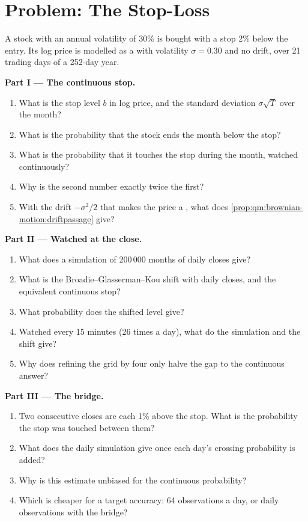 \section{Problem: The Stop-Loss}

\begin{problem}\label{pb:qm:brownian-motion:1}
A stock with an annual volatility of 30\% is bought with a stop 2\% below the entry. Its log
price is modelled as a  with volatility $\sigma = 0.30$ and no drift, over 21
trading days of a 252-day year.

\medskip\noindent\textbf{Part I --- The continuous stop.}
\begin{enumerate}
\item What is the stop level $b$ in log price, and the standard deviation $\sigma\sqrt T$ over the month?
\item What is the probability that the stock ends the month below the stop?
\item What is the probability that it touches the stop during the month, watched continuously?
\item Why is the second number exactly twice the first?
\item With the drift $-\sigma^2/2$ that makes the price a , what does \cref{prop:qm:brownian-motion:driftpassage} give?
\end{enumerate}

\medskip\noindent\textbf{Part II --- Watched at the close.}
\begin{enumerate}[resume]
\item What does a simulation of 200\,000 months of daily closes give?
\item What is the Broadie--Glasserman--Kou shift with daily closes, and the equivalent continuous stop?
\item What probability does the shifted level give?
\item Watched every 15 minutes (26 times a day), what do the simulation and the shift give?
\item Why does refining the grid by four only halve the gap to the continuous answer?
\end{enumerate}

\medskip\noindent\textbf{Part III --- The bridge.}
\begin{enumerate}[resume]
\item Two consecutive closes are each 1\% above the stop. What is the probability the stop was touched between them?
\item What does the daily simulation give once each day's crossing probability is added?
\item Why is this estimate unbiased for the continuous probability?
\item Which is cheaper for a target accuracy: 64 observations a day, or daily observations with the bridge?
\end{enumerate}


\end{problem}
